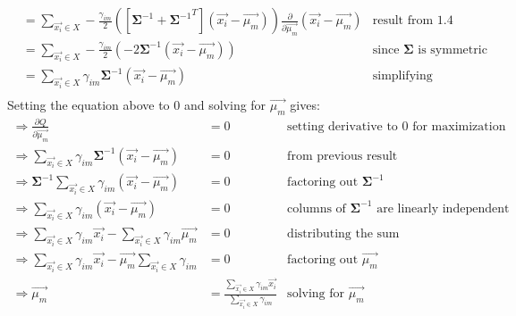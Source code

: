 \documentclass[11pt, fleqn]{article}
\newcommand{\pd}[2]{\frac{\partial #1}{\partial #2}}
\begin{document}
\begin{enumerate}
\begin{align*}
        &= \sum_{\vec{x_i} \in X} -\frac{\gamma_{im}}{2} \left( \left[ \boldsymbol{\Sigma}^{-1} + {\boldsymbol{\Sigma}^{-1}}^T \right] (\vec{x_i} - \vec{\mu_m}) \right) \pd{}{\vec{\mu_m}} (\vec{x_i} - \vec{\mu_m}) & \text{result from 1.4} \\
        &= \sum_{\vec{x_i} \in X} -\frac{\gamma_{im}}{2} \left( -2\boldsymbol{\Sigma}^{-1} (\vec{x_i} - \vec{\mu_m}) \right) & \text{since } \boldsymbol{\Sigma} \text{ is symmetric} \\
        &= \sum_{\vec{x_i} \in X} \gamma_{im} \boldsymbol{\Sigma}^{-1} (\vec{x_i} - \vec{\mu_m}) & \text{simplifying} \\
    \end{align*}
    Setting the equation above to $0$ and solving for $\vec{\mu_m}$ gives:
    \begin{align*}
        \Rightarrow \pd{Q}{\vec{\mu_m}} &= 0 & \text{setting derivative to } 0 \text{ for maximization} \\
        \Rightarrow \sum_{\vec{x_i} \in X} \gamma_{im} \boldsymbol{\Sigma}^{-1} (\vec{x_i} - \vec{\mu_m}) &= 0 & \text{from previous result} \\
        \Rightarrow \boldsymbol{\Sigma}^{-1} \sum_{\vec{x_i} \in X} \gamma_{im} (\vec{x_i} - \vec{\mu_m}) &= 0 & \text{factoring out } \boldsymbol{\Sigma}^{-1} \\
        \Rightarrow \sum_{\vec{x_i} \in X} \gamma_{im} (\vec{x_i} - \vec{\mu_m}) &= 0 & \text{columns of } \boldsymbol{\Sigma}^{-1} \text{ are linearly independent} \\
        \Rightarrow \sum_{\vec{x_i} \in X} \gamma_{im} \vec{x_i} - \sum_{\vec{x_i} \in X} \gamma_{im} \vec{\mu_m} &= 0 & \text{distributing the sum} \\
        \Rightarrow \sum_{\vec{x_i} \in X} \gamma_{im} \vec{x_i} - \vec{\mu_m} \sum_{\vec{x_i} \in X} \gamma_{im} &= 0 & \text{factoring out } \vec{\mu_m} \\
        \Rightarrow \vec{\mu_m} &= \frac{\sum_{\vec{x_i} \in X} \gamma_{im} \vec{x_i}}{\sum_{\vec{x_i} \in X} \gamma_{im}} & \text{solving for } \vec{\mu_m} \\
    \end{align*}


\end{enumerate}
\end{document}
